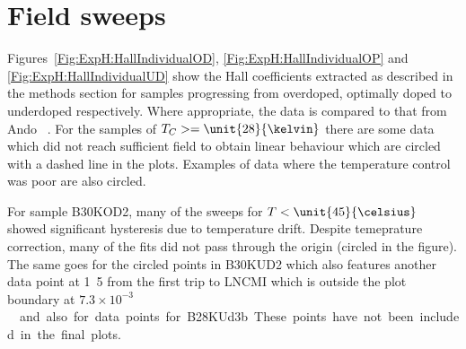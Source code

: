 

\section{Field sweeps}

Figures~\ref{Fig:ExpH:HallIndividualOD}, \ref{Fig:ExpH:HallIndividualOP} and \ref{Fig:ExpH:HallIndividualUD} show the Hall coefficients extracted as described in the methods section for samples progressing from overdoped, optimally doped to underdoped respectively. Where appropriate, the data is compared to that from Ando \etal~\cite{Ando1999}. For the samples of $T_C >= \unit{28}{\kelvin}$ there are some data which did not reach sufficient field to obtain linear behaviour which are circled with a dashed line in the plots. Examples of data where the temperature control was poor are also circled.

For sample B30KOD2, many of the sweeps for $T < \unit{45}{\celsius}$ showed significant hysteresis due to temperature drift. Despite temeprature correction, many of the fits did not pass through the origin (circled in the figure). The same goes for the circled points in B30KUD2 which also features another data point at \unit{1.5}{\kelvin} from the first trip to \ac{LNCMI} which is outside the plot boundary at \unit{$7.3\times10^{-3}$}{\centi\metre\cubed} and also for data points for B28KUd3b. These points have not been included in the final plots.

